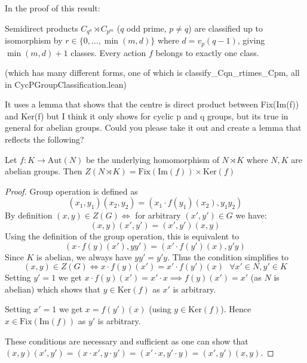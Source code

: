 In the proof of this result:

Semidirect products $C_{q^n} \rtimes C_{p^m}$ ($q$ odd prime, $p \neq q$) are classified up to isomorphism by $r \in \{0, …, \min(m, d)\}$ where $d = v_p(q - 1)$, giving $\min(m, d) + 1$ classes. Every action $f$ belongs to exactly one class.

(which has many different forms, one of which is classify_Cqn_rtimes_Cpm, all in CycPGroupClassification.lean)

It uses a lemma that shows that the centre is direct product between Fix(Im(f)) and Ker(f) but I think it only shows for cyclic p and q groups, but its true in general for abelian groups. Could you please take it out and create a lemma that reflects the following?

\begin{lemma}\label{Centre of semidirect product}
    Let $f : K \rightarrow \text{Aut}(N)$ be the underlying homomorphism of $N \rtimes K$ where $N, K$ are abelian groups. Then $Z(N \rtimes K) = \text{Fix}(\text{Im}(f)) \times \text{Ker}(f)$
\end{lemma}
\begin{proof}
    Group operation is defined as $$(x_1, y_1)(x_2, y_2) = (x_1 \cdot f(y_1)(x_2), y_1y_2)$$
    By definition $(x, y) \in Z(G) \iff$ for arbitrary $(x', y') \in G$ we have: $$(x, y)(x', y') = (x', y')(x, y)$$
    Using the definition of the group operation, this is equivalent to $$(x \cdot f(y)(x'), yy') = (x' \cdot f(y')(x), y'y)$$
    Since $K$ is abelian, we always have $yy' = y'y$. Thus the condition simplifies to $$(x, y) \in Z(G) \iff x \cdot f(y)(x') = x' \cdot f(y')(x) \text{ } \forall x' \in N, y' \in K$$
    Setting $y' = 1$ we get $x \cdot f(y)(x') = x' \cdot x \implies f(y)(x') = x'$ (as $N$ is abelian) which shows that $y \in \text{Ker}(f)$ as $x'$ is arbitrary.

    Setting $x' = 1$ we get $x = f(y')(x)$ (using $y \in \text{Ker}(f)$). Hence $x \in \text{Fix}(\text{Im}(f))$ as $y'$ is arbitrary.

    These conditions are necessary and sufficient as one can show that $(x, y)(x', y') = (x \cdot x', y \cdot y') = (x' \cdot x, y' \cdot y) = (x', y') (x, y)$.
\end{proof}